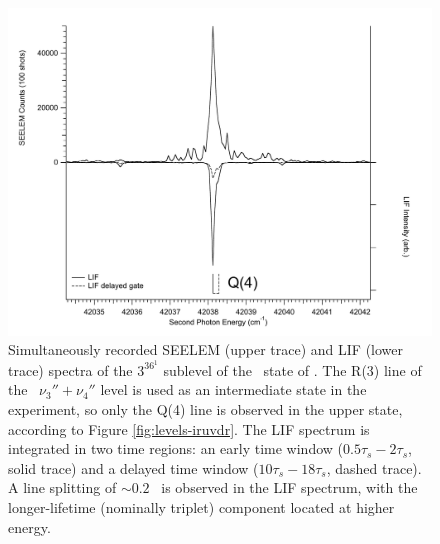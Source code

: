 \documentclass[12pt]{mitthesis}
\begin{document}
\begin{figure}
  \caption{Simultaneously recorded SEELEM (upper trace) and LIF (lower
    trace) spectra of the $3^36^1$  sublevel of the \astate\
    state of .  The R(3) line of the \xstate\ $\nu_3'' +
    \nu_4''$ level is used as an intermediate state in the experiment,
    so only the Q(4) line is observed in the upper state, according to
    Figure \ref{fig:levels-iruvdr}.  The LIF spectrum is integrated in
    two time regions: an early time window ($0.5\tau_s-2\tau_s$, solid
    trace) and a delayed time window ($10\tau_s-18\tau_s$, dashed
    trace).  A line splitting of $\sim0.2$ \rcm\ is observed in the LIF
    spectrum, with the longer-lifetime (nominally triplet) component
    located at higher energy.}
  \label{fig:3361-q4}
  \centering
  \includegraphics[width=6in]{spectrum-3361-q4-split.pdf}
\end{figure}
\end{document}
